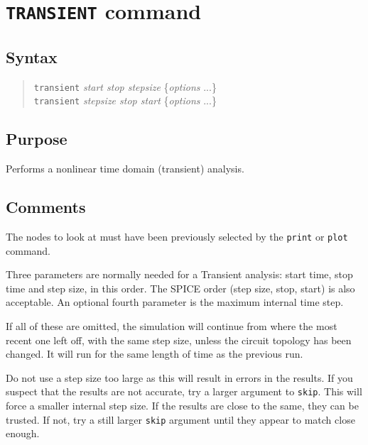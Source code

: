 \section{{\tt TRANSIENT} command}
\subsection{Syntax}
\begin{verse}
{\tt transient} {\it start stop stepsize} \{{\it options} ...\}\\
{\tt transient} {\it stepsize stop start} \{{\it options} ...\}
\end{verse}
\subsection{Purpose}

Performs a nonlinear time domain (transient) analysis.
\subsection{Comments}

The nodes to look at must have been previously selected by the {\tt print} or
{\tt plot} command.

Three parameters are normally needed for a Transient analysis: start
time, stop time and step size, in this order.  The SPICE order (step
size, stop, start) is also acceptable.  An optional fourth parameter
is the maximum internal time step.

If all of these are omitted, the simulation will continue from where the most
recent one left off, with the same step size, unless the circuit topology has
been changed.  It will run for the same length of time as the previous run.

Do not use a step size too large as this will result in errors in the
results.  If you suspect that the results are not accurate, try a
larger argument to {\tt skip}.  This will force a smaller internal
step size.  If the results are close to the same, they can be trusted.
If not, try a still larger {\tt skip} argument until they appear to
match close enough.

